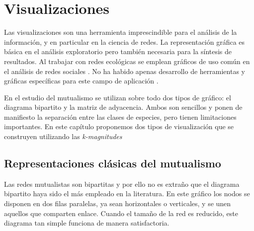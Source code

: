 
\chapter{Visualizaciones} %
\label{chapterVISUALIZACIONES}

Las visualizaciones son una herramienta imprescindible para el análisis de la información, y en particular en la ciencia de redes. La representación gráfica es básica en el análisis exploratorio pero también necesaria para la síntesis de resultados. Al trabajar con redes ecológicas se emplean gráficos de uso común en el análisis de redes sociales \cite{freeman2012social}. No ha habido apenas desarrollo de herramientas y gráficas específicas para este campo de aplicación \cite{yoon20043d, kazanci2007econet, lane2014visualization}.

En el estudio del mutualismo se utilizan sobre todo dos tipos de gráfico: el diagrama bipartito y la matriz de adyacencia. Ambos son sencillos y ponen de manifiesto la separación entre las clases de especies, pero tienen limitaciones importantes. En este capítulo proponemos dos tipos de visualización que se construyen utilizando las \textit{k-magnitudes}

\label{VISUALIZACIÓN} %


\section{Representaciones clásicas del mutualismo}

Las redes mutualistas son bipartitas y por ello no es extraño que el diagrama bipartito haya sido el más empleado en la literatura. En este 
gráfico los nodos se disponen en dos filas paralelas, ya sean horizontales o verticales, y se unen aquellos que comparten enlace. Cuando el tamaño
de la red es reducido, este diagrama tan simple funciona de manera satisfactoria.


